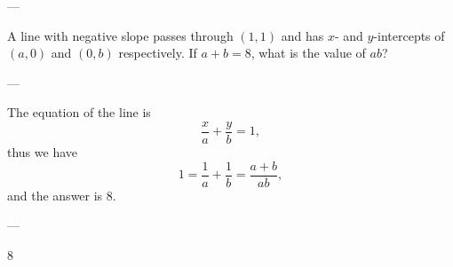 
---

A line with negative slope passes through $(1,1)$ and has $x$- and $y$-intercepts of $(a,0)$ and $(0,b)$ respectively. If $a+b=8$, what is the value of $ab$?

---

The equation of the line is \[\frac xa+\frac yb=1,\]
thus we have \[1=\frac1a+\frac1b=\frac{a+b}{ab},\]
and the answer is $8$.

---

8
